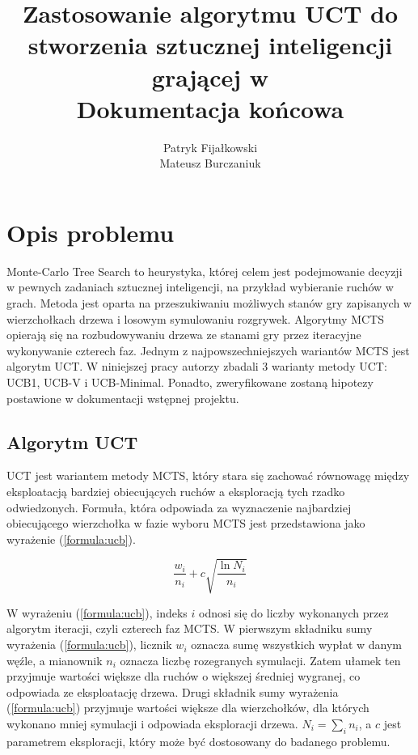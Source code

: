 \documentclass[a4paper,12pt]{article}
\title{
	Zastosowanie algorytmu UCT do stworzenia sztucznej inteligencji grającej w \nazwagry\\
	\large Dokumentacja końcowa}
\author{Patryk Fijałkowski \\ Mateusz Burczaniuk}
\let\oldsection\section
\renewcommand\section{\clearpage\oldsection}
\begin{document}
\begin{titlingpage}
	\maketitle
	\vspace{3cm}
\end{titlingpage}

\section{Opis problemu}
Monte-Carlo Tree Search to heurystyka, której celem jest podejmowanie decyzji w pewnych zadaniach sztucznej inteligencji, na przykład wybieranie ruchów w grach. Metoda jest oparta na przeszukiwaniu możliwych stanów gry zapisanych w wierzchołkach drzewa i losowym symulowaniu rozgrywek. Algorytmy MCTS opierają się na rozbudowywaniu drzewa ze stanami gry przez iteracyjne wykonywanie czterech faz. Jednym z najpowszechniejszych wariantów MCTS jest algorytm UCT. W niniejszej pracy autorzy zbadali 3 warianty metody UCT: UCB1, UCB-V i UCB-Minimal. Ponadto, zweryfikowane zostaną hipotezy postawione w dokumentacji wstępnej projektu.


\subsection{Algorytm UCT} \label{subsec:uct}
UCT jest wariantem metody MCTS, który stara się zachować równowagę między eksploatacją bardziej obiecujących ruchów a eksploracją tych rzadko odwiedzonych. Formuła, która odpowiada za wyznaczenie najbardziej obiecującego wierzchołka w fazie wyboru MCTS jest przedstawiona jako wyrażenie (\ref{formula:ucb}).

\begin{equation}\label{formula:ucb}
\frac{w_i}{n_i} + c \sqrt{\frac{\ln N_i}{n_i}}
\end{equation}

W wyrażeniu (\ref{formula:ucb}), indeks $i$ odnosi się do liczby wykonanych przez algorytm iteracji, czyli czterech faz MCTS. W pierwszym składniku sumy wyrażenia (\ref{formula:ucb}), licznik $w_i$ oznacza sumę wszystkich wypłat w danym węźle, a mianownik $n_i$ oznacza liczbę rozegranych symulacji. Zatem ułamek ten przyjmuje wartości większe dla ruchów o większej średniej wygranej, co odpowiada ze eksploatację drzewa. Drugi składnik sumy wyrażenia (\ref{formula:ucb}) przyjmuje wartości większe dla wierzchołków, dla których wykonano mniej symulacji i odpowiada eksploracji drzewa. $N_i=\sum_i n_i$, a $c$ jest parametrem eksploracji, który może być dostosowany do badanego problemu.
\end{document}
